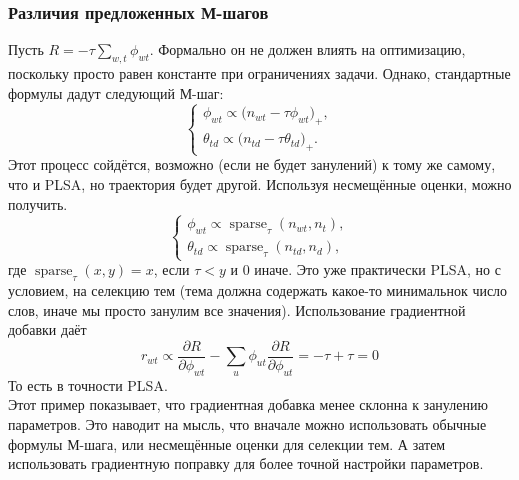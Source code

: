 \documentclass[12pt]{article}
\DeclareMathOperator{\sparse}{sparse}
\begin{document}
 \subsubsection{Различия предложенных М-шагов}
Пусть $R = -\tau \sum\limits_{w, t} \phi_{wt}$. Формально он не должен влиять на оптимизацию, поскольку просто равен константе при ограничениях задачи. Однако, стандартные формулы дадут следующий М-шаг:
\[
\left\{
	\begin{aligned}
		\phi_{wt} \propto \bigl( n_{wt} - \tau \phi_{wt}\bigr)_{+},\\
		\theta_{td} \propto \bigl( n_{td} - \tau \theta_{td}\bigr)_{+}.
	\end{aligned}
\right.
\]
Этот процесс сойдётся, возможно (если не будет занулений) к тому же самому, что и PLSA, но траектория будет другой. Используя несмещённые оценки, можно получить.
\[
\left\{
	\begin{aligned}
		\phi_{wt} \propto  \sparse_{\tau}(n_{wt}, n_{t}),\\
		\theta_{td} \propto \sparse_{\tau}(n_{td}, n_{d}),
	\end{aligned}
\right.
\]
где $\sparse_{\tau}(x, y) = x$, если $\tau < y$ и $0$ иначе. Это уже практически PLSA, но с условием, на селекцию тем (тема должна содержать какое-то минимальнок число слов, иначе мы просто занулим все  значения).
Использование градиентной добавки даёт 
\[
r_{wt} \propto \frac{\partial{R}}{\partial{\phi_{wt}}} - \sum\limits_u \phi_{ut} \frac{\partial{R}}{\partial{\phi_{ut}}} = -\tau + \tau =0
\]
То есть в точности PLSA.\\

Этот пример показывает, что градиентная добавка менее склонна к занулению параметров. Это наводит на мысль, что вначале можно использовать обычные формулы М-шага, или несмещённые оценки для селекции тем. А затем использовать градиентную поправку для более точной настройки параметров.\\
\end{document}
